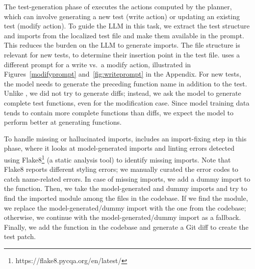 The test-generation phase of \solx executes the actions computed by the planner,
which can involve generating a new test (write action) or updating an existing
test (modify action). To guide
the LLM in this task, we extract the test structure and imports from the
localized test file and make them available in the prompt.
This reduces the burden on the LLM to generate imports.
The file structure is relevant for new tests, to
determine their insertion point in the test file.
\solx uses a different prompt for a write vs.\ a modify action,
illustrated in Figures~\ref{modifyprompt} and~\ref{fig:writeprompt} in the Appendix.
For new tests, the model needs to generate the preceding function name in
addition to the test. Unlike \citet{mundler2024swtbench}, we did not
try to generate diffs; instead, we ask the model to generate complete test
functions, even for the modification case.
Since model training data tends to contain more complete functions
than diffs, we expect the model to perform better at generating
functions.

To handle missing or hallucinated imports, \solx includes an import-fixing step
in this phase, where it looks at model-generated imports and
linting errors detected using
Flake8\footnote{https://flake8.pycqa.org/en/latest/} (a static analysis tool)
to identify missing imports. Note that Flake8 reports different styling errors;
we manually curated the error codes to catch name-related errors.  In case of
missing imports, we add a dummy import to the function. Then, we take the
model-generated and dummy imports and try to find the imported module among the
files in the codebase. If we find the module, we replace the
model-generated/dummy import with the one from the codebase; otherwise, we
continue with the model-generated/dummy import as a fallback. Finally, we add
the function in the codebase and generate a Git diff to create the test
patch.


